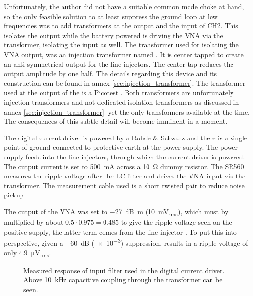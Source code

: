 Unfortunately, the author did not have a suitable common mode choke at hand, so the only feasible solution to at least suppress the ground loop at low frequencies was to add transformers at the output and the input of CH2. This isolates the output while the battery powered  is driving the VNA via the transformer, isolating the input as well. The transformer used for isolating the VNA output, was an injection transformer named . It is center tapped to create an anti-symmetrical output for the line injectors. The center tap reduces the output amplitude by one half. The details regarding this device and its construction can be found in annex \ref{sec:injection_transformer}. The transformer used at the output of the  is a Picotest . Both transformers are unfortunately injection transformers and not dedicated isolation transformers as discussed in annex \ref{sec:injection_transformer}, yet the only transformers available at the time. The consequences of this subtle detail will become imminent in a moment.

The digital current driver is powered by a Rohde \& Schwarz  and there is a single point of ground connected to protective earth at the power supply. The power supply feeds into the line injectors, through which the current driver is powered. The output current is set to \qty{500}{\mA} across a \qty{10}{\ohm} dummy resistor. The SR560 measures the ripple voltage after the LC filter and drives the VNA input via the transformer. The measurement cable used is a short  twisted pair to reduce noise pickup.

The output of the VNA was set to \qty{-27}{\dB m} (\qty{10}{\mV_{rms}}), which must by multiplied by about $0.5 \cdot 0.975 = 0.485$ to give the ripple voltage seen on the positive supply, the latter term comes from the line injector \cite{line_injector_github}. To put this into perspective, given a \qty{-60}{\dB} (\num{e-3}) suppression, results in a ripple voltage of only \qty{4.9}{\uV_{rms}}.
\begin{figure}[ht]
    \centering
    
    \caption{Measured response of input filter used in the digital current driver. Above \qty{10}{\kHz} capacitive coupling through the transformer can be seen.}
    \label{fig:laser_driver_input_filter_bode}
\end{figure}

